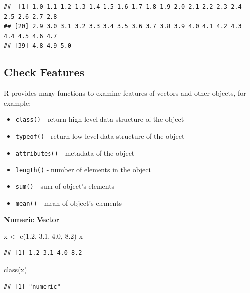 \documentclass[
]{book}
\newenvironment{Shaded}{\begin{snugshade}}{\end{snugshade}}
\newcommand{\FloatTok}[1]{\textcolor[rgb]{0.00,0.00,0.81}{#1}}
\newcommand{\FunctionTok}[1]{\textcolor[rgb]{0.00,0.00,0.00}{#1}}
\newcommand{\NormalTok}[1]{#1}
\newcommand{\OtherTok}[1]{\textcolor[rgb]{0.56,0.35,0.01}{#1}}
\providecommand{\tightlist}{%
  \setlength{\itemsep}{0pt}\setlength{\parskip}{0pt}}
\begin{document}
\begin{verbatim}
##  [1] 1.0 1.1 1.2 1.3 1.4 1.5 1.6 1.7 1.8 1.9 2.0 2.1 2.2 2.3 2.4 2.5 2.6 2.7 2.8
## [20] 2.9 3.0 3.1 3.2 3.3 3.4 3.5 3.6 3.7 3.8 3.9 4.0 4.1 4.2 4.3 4.4 4.5 4.6 4.7
## [39] 4.8 4.9 5.0
\end{verbatim}

\hypertarget{check-features}{%
\subsection{Check Features}\label{check-features}}

R provides many functions to examine features of vectors and other objects, for example:

\begin{itemize}
\tightlist
\item
  \texttt{class()} - return high-level data structure of the object
\item
  \texttt{typeof()} - return low-level data structure of the object
\item
  \texttt{attributes()} - metadata of the object
\item
  \texttt{length()} - number of elements in the object
\item
  \texttt{sum()} - sum of object's elements
\item
  \texttt{mean()} - mean of object's elements
\end{itemize}

\textbf{Numeric Vector}

\begin{Shaded}
\begin{Highlighting}[]
\NormalTok{x }\OtherTok{\textless{}{-}} \FunctionTok{c}\NormalTok{(}\FloatTok{1.2}\NormalTok{, }\FloatTok{3.1}\NormalTok{, }\FloatTok{4.0}\NormalTok{, }\FloatTok{8.2}\NormalTok{)}
\NormalTok{x}
\end{Highlighting}
\end{Shaded}

\begin{verbatim}
## [1] 1.2 3.1 4.0 8.2
\end{verbatim}

\begin{Shaded}
\begin{Highlighting}[]
\FunctionTok{class}\NormalTok{(x)}
\end{Highlighting}
\end{Shaded}

\begin{verbatim}
## [1] "numeric"
\end{verbatim}
\end{document}
